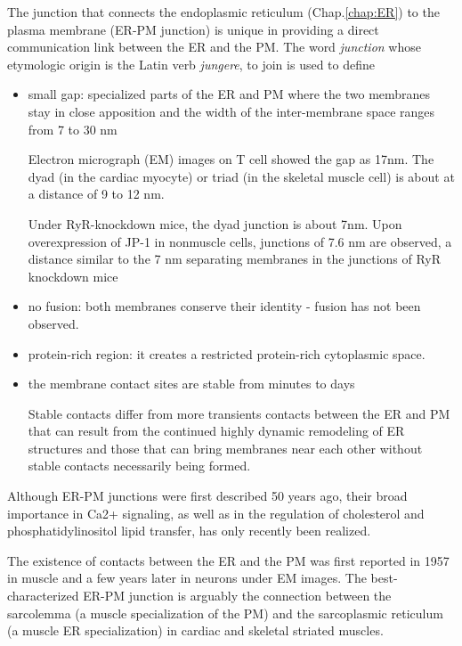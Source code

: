 The junction that connects the endoplasmic reticulum (Chap.\ref{chap:ER}) to the
plasma membrane (ER-PM junction) is unique in providing a direct communication
link between the ER and the PM.
The word {\it junction} whose etymologic origin is the Latin verb {\it jungere},
to join is used to define
\begin{itemize}
  
  \item  small gap: specialized parts of the ER and PM where the two membranes
  stay in close apposition and the width of the inter-membrane space ranges from
  7 to 30 nm

Electron micrograph (EM) images on T cell showed the gap as 17nm.  
The dyad (in the cardiac myocyte) or triad (in the skeletal muscle cell) is
about at a distance of 9 to 12 nm.

Under RyR-knockdown mice, the dyad junction is about 7nm.
Upon overexpression of JP-1 in nonmuscle cells, junctions of 7.6 nm are
observed, a distance similar to the 7 nm separating membranes in the junctions
of RyR knockdown mice


  \item no fusion: both membranes conserve their identity - fusion has not been
  observed.
  
  \item protein-rich region: it creates a restricted protein-rich cytoplasmic
  space.

  \item the membrane contact sites are stable from minutes to days
 
 Stable contacts differ from more transients contacts between the ER and PM that
 can
result from the continued highly dynamic remodeling of ER structures and those
that can bring membranes near each other without stable contacts necessarily
being formed.

\end{itemize}

Although ER-PM junctions were first described 50 years ago, their broad
importance in Ca2+ signaling, as well as in the regulation of cholesterol and
phosphatidylinositol lipid transfer, has only recently been realized.

The existence of contacts between the ER and the PM was first reported in 1957
in muscle and a few years later in neurons under EM images.
The best-characterized ER-PM junction is arguably the connection between the
sarcolemma (a muscle specialization of the PM) and the sarcoplasmic reticulum (a
muscle ER specialization) in cardiac and skeletal striated muscles.

